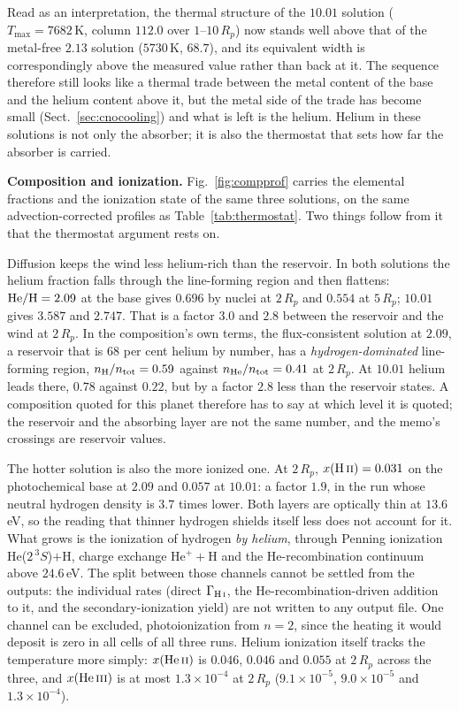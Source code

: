 \documentclass[english,a4paper]{my_memo}
\begin{document}
\medskip
\noindent Read as an interpretation, the thermal structure of the $10.01$
solution ($T_{\max} = 7682$\,K, column $112.0$ over $1$--$10\,R_p$) now
stands well above that of the metal-free $2.13$ solution ($5730$\,K, $68.7$),
and its equivalent width is correspondingly above the measured value rather
than back at it. The sequence therefore still looks like a thermal trade
between the metal content of the base and the helium content above it, but
the metal side of the trade has become small (Sect.~\ref{sec:cnocooling}) and
what is left is the helium. Helium in these solutions is not only the
absorber; it is also the thermostat that sets how far the absorber is
carried.

\medskip
\noindent\textbf{Composition and ionization.} Fig.~\ref{fig:compprof} carries
the elemental fractions and the ionization state of the same three solutions,
on the same advection-corrected profiles as Table~\ref{tab:thermostat}. Two
things follow from it that the thermostat argument rests on.

\smallskip
\noindent Diffusion keeps the wind less helium-rich than the reservoir. In
both solutions the helium fraction falls through the line-forming region and
then flattens: ${\rm He/H} = 2.09$ at the base gives $0.696$ by nuclei at
$2\,R_p$ and $0.554$ at $5\,R_p$; $10.01$ gives $3.587$ and $2.747$. That is
a factor $3.0$ and $2.8$ between the reservoir and the wind at $2\,R_p$. In
the composition's own terms, the flux-consistent solution at $2.09$, a
reservoir that is $68$ per cent helium by number, has a
\emph{hydrogen-dominated} line-forming region,
$n_{\rm H}/n_{\rm tot} = 0.59$ against $n_{\rm He}/n_{\rm tot} = 0.41$ at
$2\,R_p$. At $10.01$ helium leads there, $0.78$ against $0.22$, but by a
factor $2.8$ less than the reservoir states. A composition quoted for this
planet therefore has to say at which level it is quoted; the reservoir and
the absorbing layer are not the same number, and the memo's crossings are
reservoir values.

\smallskip
\noindent The hotter solution is also the more ionized one. At $2\,R_p$,
$x({\rm H\,\textsc{ii}}) = 0.031$ on the photochemical base at $2.09$ and
$0.057$ at $10.01$: a factor $1.9$, in the run whose neutral hydrogen density
is $3.7$ times lower. Both layers are optically thin at $13.6$\,eV, so the
reading that thinner hydrogen shields itself less does not account for it.
What grows is the ionization of hydrogen \emph{by helium}, through Penning
ionization He($2\,^3S$)$+$H, charge exchange He$^+ +$H and the
He-recombination continuum above $24.6$\,eV. The split between those channels
cannot be settled from the outputs: the individual rates (direct
$\Gamma_{\rm H\,\textsc{i}}$, the He-recombination-driven addition to it, and
the secondary-ionization yield) are not written to any output file. One
channel can be excluded, photoionization from $n=2$, since the heating it
would deposit is zero in all cells of all three runs. Helium ionization
itself tracks the temperature more simply: $x({\rm He\,\textsc{ii}})$ is
$0.046$, $0.046$ and $0.055$ at $2\,R_p$ across the three, and
$x({\rm He\,\textsc{iii}})$ is at most $1.3\times10^{-4}$ at $2\,R_p$
($9.1\times10^{-5}$, $9.0\times10^{-5}$ and $1.3\times10^{-4}$).
\end{document}
